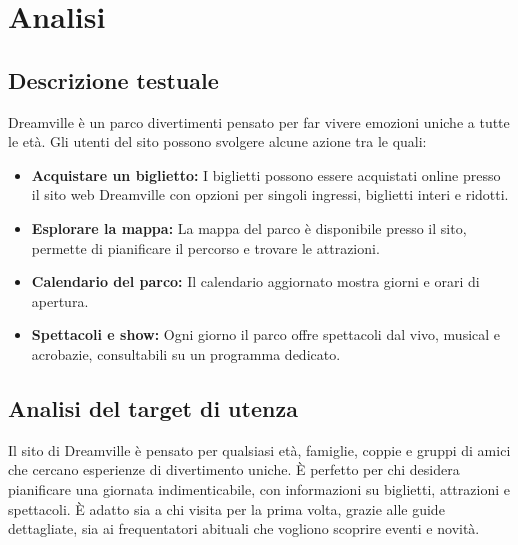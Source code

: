 \section{Analisi}
\subsection{Descrizione testuale}

Dreamville è un parco divertimenti pensato per far vivere emozioni uniche a tutte le età.
Gli utenti del sito possono svolgere alcune azione tra le quali:
\begin{itemize}
    \item \textbf{Acquistare un biglietto:} I biglietti possono essere acquistati online presso il sito web Dreamville con opzioni per singoli ingressi, biglietti interi e ridotti.
    \item \textbf{Esplorare la mappa:} La mappa del parco è disponibile presso il sito, permette di pianificare il percorso e trovare le attrazioni.
    \item \textbf{Calendario del parco:} Il calendario aggiornato mostra giorni e orari di apertura.
    \item \textbf{Spettacoli e show:} Ogni giorno il parco offre spettacoli dal vivo, musical e acrobazie, consultabili su un programma dedicato.
\end{itemize}
\subsection{Analisi del target di utenza}
Il sito di Dreamville è pensato per qualsiasi età, famiglie, coppie e gruppi di amici che cercano esperienze di divertimento uniche. È perfetto per chi desidera pianificare una giornata indimenticabile, con informazioni su biglietti, attrazioni e spettacoli. È adatto sia a chi visita per la prima volta, grazie alle guide dettagliate, sia ai frequentatori abituali che vogliono scoprire eventi e novità.
